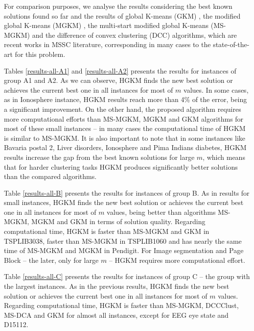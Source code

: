 For comparison purposes, we analyse the results considering the best known solutions found so far and the results of global K-means (GKM) \cite{Likas2003}, the modified global K-means (MGKM) \cite{Bagirov2008}, the multi-start modified global K-means (MS-MGKM) \cite{Ordin2014} and the difference of convex clustering (DCC) \cite{Bagirov2016} algorithms, which are recent works in MSSC literature, corresponding in many cases to the state-of-the-art for this problem.

Tables \ref{results-all-A1} and \ref{results-all-A2} presents the results for instances of group A1 and A2. As we can observe, HGKM finds the new best solution or achieves the current best one in all instances for most of $m$ values. In some cases, as in Ionosphere instance, HGKM results reach more than 4\% of the error, being a significant improvement. On the other hand, the proposed algorithm requires more computational efforts than MS-MGKM, MGKM and GKM algorithms for most of these small instances -- in many cases the computational time of HGKM is similar to MS-MGKM. It is also important to note that in some instances like Bavaria postal 2, Liver disorders, Ionosphere and Pima Indians diabetes, HGKM results increase the gap from the best known solutions for large $m$, which means that for harder clustering tasks HGKM produces significantly better solutions than the compared algorithms.

Table \ref{results-all-B} presents the results for instances of group B. As in results for small instances, HGKM finds the new best solution or achieves the current best one in all instances for most of $m$ values, being better than algorithms MS-MGKM, MGKM and GKM in terms of solution quality. Regarding computational time, HGKM is faster than MS-MGKM and GKM in TSPLIB3038, faster than MS-MGKM in TSPLIB1060 and has nearly the same time of MS-MGKM and MGKM in Pendigit. For Image segmentation and Page Block -- the later, only for large $m$ -- HGKM requires more computational effort.

Table \ref{results-all-C} presents the results for instances of group C -- the group with the largest instances. As in the previous results, HGKM finds the new best solution or achieves the current best one in all instances for most of $m$ values. Regarding computational time, HGKM is faster than MS-MGKM, DCCClust, MS-DCA and GKM for almost all instances, except for EEG eye state and D15112.



